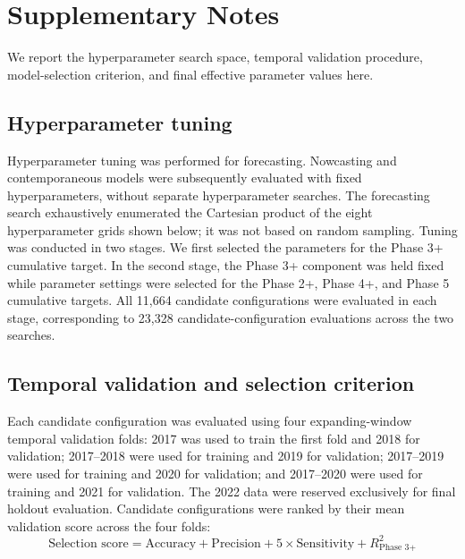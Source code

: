 \documentclass[pdflatex,sn-mathphys-num]{sn-jnl}%
\theoremstyle{thmstyleone}%
\theoremstyle{thmstyletwo}%
\theoremstyle{thmstylethree}%
\begin{document}
\newpage
\clearpage
\section*{Supplementary Notes}
We report the hyperparameter search space, temporal validation procedure, model-selection criterion, and final effective parameter values here. 

\subsection* {Hyperparameter tuning}
Hyperparameter tuning was performed for forecasting. Nowcasting and contemporaneous models were subsequently evaluated with fixed hyperparameters, without separate hyperparameter searches. The forecasting search exhaustively enumerated the Cartesian product of the eight hyperparameter grids shown below; it was not based on random sampling. Tuning was conducted in two stages. We first selected the parameters for the Phase 3+ cumulative target. In the second stage, the Phase 3+ component was held fixed while parameter settings were selected for the Phase 2+, Phase 4+, and Phase 5 cumulative targets. All 11,664 candidate configurations were evaluated in each stage, corresponding to 23,328 candidate-configuration evaluations across the two searches.

\subsection*{Temporal validation and selection criterion}
Each candidate configuration was evaluated using four expanding-window temporal validation folds: 2017 was used to train the first fold and 2018 for validation; 2017–2018 were used for training and 2019 for validation; 2017–2019 were used for training and 2020 for validation; and 2017–2020 were used for training and 2021 for validation. The 2022 data were reserved exclusively for final holdout evaluation. Candidate configurations were ranked by their mean validation score across the four folds:
\begin{equation*}
\text{Selection score} =\text{Accuracy}+\text{Precision}+5 \times \text{Sensitivity}+R^2_{\text{Phase 3+}}
\end{equation*}
\end{document}
